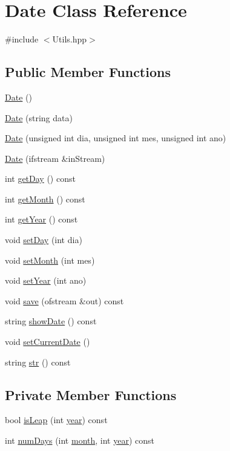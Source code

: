 \hypertarget{class_date}{}\section{Date Class Reference}
\label{class_date}


{\ttfamily \#include $<$Utils.\+hpp$>$}

\subsection*{Public Member Functions}
\begin{DoxyCompactItemize}
\item 
\hyperlink{class_date_a4e59ed4ba66eec61c27460c5d09fa1bd}{Date} ()
\item 
\hyperlink{class_date_aed0ec4ac9e00fb6130f8a642a61180b9}{Date} (string data)
\item 
\hyperlink{class_date_ae0f1f3db515c009b0a9f77869edc7599}{Date} (unsigned int dia, unsigned int mes, unsigned int ano)
\item 
\hyperlink{class_date_a5b859c0abe4bcf936dc7a7124e079659}{Date} (ifstream \&in\+Stream)
\item 
int \hyperlink{class_date_a0f253815240e70f4c39cb93cc68bd3f4}{get\+Day} () const
\item 
int \hyperlink{class_date_a332f6e3a2f6a40d73742b6dab7be0f64}{get\+Month} () const
\item 
int \hyperlink{class_date_a8b0869f34c2b38d108ab83ee2e770e5d}{get\+Year} () const
\item 
void \hyperlink{class_date_a742b1032af5bbd3e4c9ddfc9c21c1a5a}{set\+Day} (int dia)
\item 
void \hyperlink{class_date_a11b56160e1dbb550b68a7dd54c968204}{set\+Month} (int mes)
\item 
void \hyperlink{class_date_a62230a93ff2ce92cd4b30408622393af}{set\+Year} (int ano)
\item 
void \hyperlink{class_date_af7ea8f12ad1c018f58dbc85f9c844b03}{save} (ofstream \&out) const
\item 
string \hyperlink{class_date_affb645fa983d4e0317ba0aa8f5998fd1}{show\+Date} () const
\item 
void \hyperlink{class_date_ada293ae20419963c246a7831096f6091}{set\+Current\+Date} ()
\item 
string \hyperlink{class_date_a5ea4980f43e2b098e033651e199d2793}{str} () const
\end{DoxyCompactItemize}
\subsection*{Private Member Functions}
\begin{DoxyCompactItemize}
\item 
bool \hyperlink{class_date_a434957869afa4b4e1275e00fe6a67216}{is\+Leap} (int \hyperlink{class_date_a3eeced2ed56bc95d56782b9e738db8ea}{year}) const
\item 
int \hyperlink{class_date_a102f0523e4d84ad9cef682f2ff233808}{num\+Days} (int \hyperlink{class_date_a533843e07c6ac8d19fee9b16f5336ba2}{month}, int \hyperlink{class_date_a3eeced2ed56bc95d56782b9e738db8ea}{year}) const
\end{DoxyCompactItemize}
